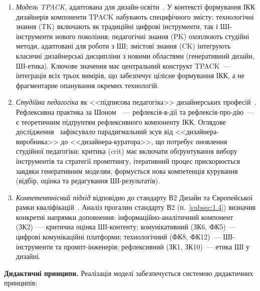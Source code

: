 \begin{enumerate}
    \item \textit{Модель TPACK}, адаптована для дизайн-освіти~\cite{Mishra2006}. У контексті формування ІКК дизайнерів компоненти TPACK набувають специфічного змісту: технологічні знання (TK) включають як традиційні цифрові інструменти, так і ШІ-інструменти нового покоління; педагогічні знання (PK) охоплюють студійні методи, адаптовані для роботи з ШІ; змістові знання (CK) інтегрують класичні дизайнерські дисципліни з новими областями (генеративний дизайн, ШІ-етика). Ключове значення має центральний конструкт TPACK~--- інтеграція всіх трьох вимірів, що забезпечує цілісне формування ІКК, а не фрагментарне опанування окремих технологій.

    \item \textit{Студійна педагогіка} як <<підписова педагогіка>> дизайнерських професій~\cite{Shulman2005}. Рефлексивна практика за Шоном~\cite{Schon1983}~--- рефлексія-в-дії та рефлексія-про-дію~--- є теоретичним підґрунтям рефлексивного компоненту ІКК. Оглядове дослідження~\cite{Musiienko2026ScopingReview} зафіксувало парадигмальний зсув від <<дизайнера-виробника>> до <<дизайнера-куратора>>, що потребує оновлення студійної педагогіки: критика (crit) має включати обґрунтування вибору інструментів та стратегії промптингу, ітеративний процес прискорюється завдяки генеративним моделям, формується нова компетенція курування (відбір, оцінка та редагування ШІ-результатів).

    \item \textit{Компетентнісний підхід} відповідно до стандарту В2 Дизайн та Європейської рамки кваліфікацій~\cite{Musiienko2025DesignEducation}. Аналіз прогалин стандарту В2 (п.~\ref{subsec:1.4}) визначив конкретні напрямки доповнення: інформаційно-аналітичний компонент (ЗК2)~--- критична оцінка ШІ-контенту; комунікативний (ЗК6, ФК5)~--- цифрові комунікаційні платформи; технологічний (ФК8, ФК12)~--- ШІ-інструменти та промпт-інженерія; рефлексивний (ЗК1, ЗК10)~--- етика ШІ у дизайні.
\end{enumerate}

\textbf{Дидактичні принципи.} Реалізація моделі забезпечується системою дидактичних принципів:


